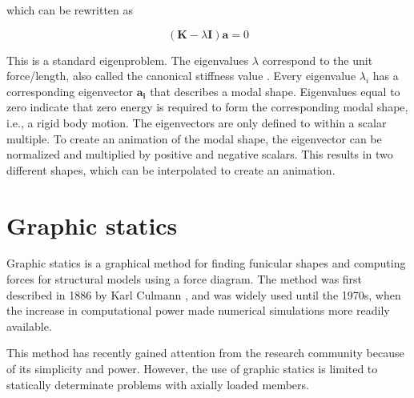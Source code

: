 which can be rewritten as

\begin{equation*}
(\mathbf{K} - \lambda \mathbf{I})\mathbf{a} = 0
\end{equation*}

This is a standard eigenproblem. The eigenvalues   $\lambda$ correspond to the unit force/length, also called the canonical stiffness value \cite{Olsson2006}. Every eigenvalue  $\lambda_i$ has a corresponding eigenvector   $\mathbf{a_i}$ that describes a modal shape. Eigenvalues equal to zero indicate that zero energy is required to form the corresponding modal shape, i.e., a rigid body motion. The eigenvectors are only defined to within a scalar multiple. To create an animation of the modal shape, the eigenvector can be normalized and multiplied by positive and negative scalars. This results in two different shapes, which can be interpolated to create an animation.


\section{Graphic statics}
Graphic statics is a graphical method for finding funicular shapes and computing forces for structural models using a force diagram. The method was first described in 1886 by Karl Culmann \cite{Culmann1866}, and was widely used until the 1970s, when the increase in computational power made numerical simulations more readily available. 

This method has recently gained attention from the research community \cite{Todisco2015, Block, Fivet2013} because of its simplicity and power. However, the use of graphic statics is limited to statically determinate problems with axially loaded members. 

